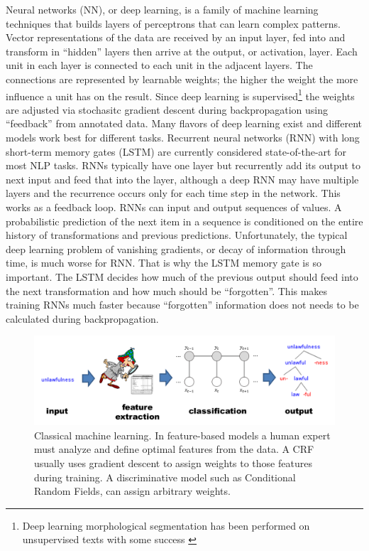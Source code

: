 \documentclass[12pt]{article}
\begin{document}
 Neural networks (NN), or deep learning, is a family of machine learning techniques that builds layers of perceptrons that can learn complex patterns. Vector representations of the data are received by an input layer, fed into and transform in ``hidden'' layers then arrive at the output, or activation, layer.  Each unit in each layer is connected to each unit in the adjacent layers. The connections are represented by learnable weights; the higher the weight the more influence a unit has on the result. Since deep learning is supervised\footnote{Deep learning morphological segmentation has been performed on unsupervised texts with some success \cite{wang_morphological_2016}} the weights are adjusted via stochasitc gradient descent during backpropagation using ``feedback'' from annotated data. Many flavors of deep learning exist and different models work best for different tasks. Recurrent neural networks (RNN) \cite{Elman91} with long short-term memory gates (LSTM) \cite{Hochreiter_1997} are currently considered state-of-the-art for most NLP tasks. RNNs typically have one layer but recurrently add its output to next input and feed that into the layer, although a deep RNN may have multiple layers and the recurrence occurs only for each time step in the network. This works as a feedback loop. RNNs can input and output sequences of values. A probabilistic prediction of the next item in a sequence is conditioned on the entire history of transformations and previous predictions. Unfortunately, the typical deep learning problem of vanishing gradients, or decay of information through time, is much worse for RNN. That is why the LSTM memory gate is so important. The LSTM decides how much of the previous output should feed into the next transformation and how much should be ``forgotten''. This makes training RNNs much faster because ``forgotten'' information does not needs to be calculated during backpropagation.
 
 \begin{figure}[ht]
\label{fig:Features-ML}
\begin{center}
\includegraphics[width=0.95\columnwidth]{Features-ML.PNG}
\caption{Classical machine learning. In feature-based models a human expert must analyze and define optimal features from the data. A CRF usually uses gradient descent to assign weights to those features during training. A discriminative model such as Conditional Random Fields, can assign arbitrary weights.}
\end{center}
\end{figure}
\end{document}

